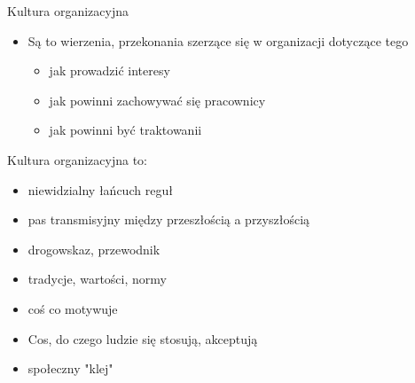 \documentclass[a4paper,10pt]{report}
\begin{document}
\noindent Kultura organizacyjna
\begin{itemize}
	\item Są to wierzenia, przekonania szerzące się w organizacji dotyczące tego
	\begin{itemize}
		\item jak prowadzić interesy
		\item jak powinni zachowywać się pracownicy
		\item jak powinni być traktowanii
	\end{itemize}
\end{itemize}

\noindent Kultura organizacyjna to:
\begin{itemize}
	\item niewidzialny łańcuch reguł
	\item pas transmisyjny między przeszłością a przyszłością
	\item drogowskaz, przewodnik
	\item tradycje, wartości, normy
	\item coś co motywuje
	\item Cos, do czego ludzie się stosują, akceptują
	\item społeczny "klej"
\end{itemize}
\end{document}

